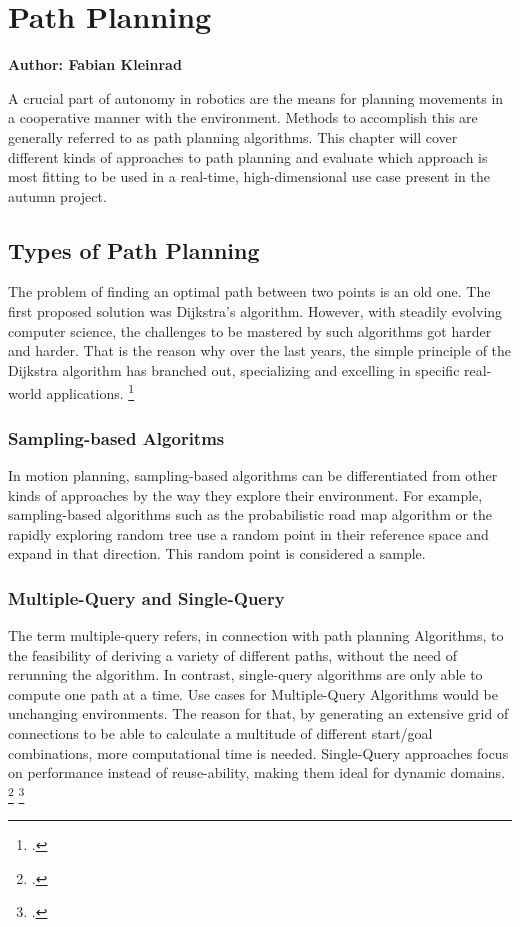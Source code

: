 \chapter{Path Planning}
\label{chapter:path_planning}

\textbf{Author: Fabian Kleinrad} 

A crucial part of autonomy in robotics are the means for planning movements in a cooperative manner with the environment. Methods to accomplish this are generally referred to as path planning algorithms. This chapter will cover different kinds of approaches to path planning and evaluate which approach is most fitting to be used in a real-time, high-dimensional use case present in the autumn project.


\section{Types of Path Planning}

The problem of finding an optimal path between two points is an old one.
The first proposed solution was Dijkstra's algorithm. However, with steadily evolving computer science, the challenges to be mastered by such algorithms got harder and harder. That is the reason why over the last years, the simple principle of the Dijkstra algorithm has branched out, specializing and excelling in specific real-world applications.
\footcite{Pan2020}

\subsection{Sampling-based Algoritms}

In motion planning, sampling-based algorithms can be differentiated from other kinds of approaches by the way they explore their environment. For example, sampling-based algorithms such as the probabilistic road map algorithm or the rapidly exploring random tree use a random point in their reference space and expand in that direction. This random point is considered a sample.

\subsection{Multiple-Query and Single-Query}

The term multiple-query refers, in connection with path planning Algorithms, to the feasibility of deriving a variety of different paths, without the need of rerunning the algorithm. In contrast, single-query algorithms are only able to compute one path at a time.\newline
Use cases for Multiple-Query Algorithms would be unchanging environments. The reason for that, by generating an extensive grid of connections to be able to calculate a multitude of different start/goal combinations, more computational time is needed.\newline
Single-Query approaches focus on performance instead of reuse-ability, making them ideal for dynamic domains. 
\footcite{Bekris2003}
\footcite{stackexchangeMultiSingleQuery2019}

